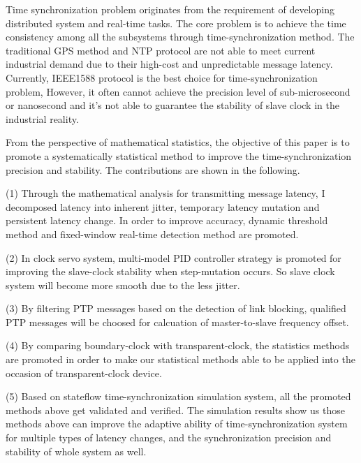 \begin{englishabstract}

Time synchronization problem originates from the requirement of developing distributed system and real-time tasks. The core problem is to achieve the time consistency among all the subsystems through time-synchronization method. The traditional GPS method and NTP protocol are not able to meet current industrial demand due to their high-cost and unpredictable message latency. Currently, IEEE1588 protocol is the best choice for time-synchronization problem, However, it often cannot achieve the precision level of sub-microsecond or nanosecond and it's not able to guarantee the stability of slave clock in the industrial reality.

From the perspective of mathematical statistics, the objective of this paper is to promote a systematically statistical method to improve the time-synchronization precision and stability. The contributions are shown in the following.

(1) Through the mathematical analysis for transmitting message latency, I decomposed latency into inherent jitter, temporary latency mutation and persistent latency change. In order to improve accuracy, dynamic threshold method and fixed-window real-time detection method are promoted.

(2) In clock servo system, multi-model PID controller strategy is promoted for improving the slave-clock stability when step-mutation occurs. So slave clock system will become more smooth due to the less jitter.

(3) By filtering PTP messages based on the detection of link blocking, qualified PTP messages will be choosed for calcuation of master-to-slave frequency offset.

(4) By comparing boundary-clock with transparent-clock, the statistics methods are promoted in order to make our statistical methods able to be applied into the occasion of transparent-clock device.

(5) Based on stateflow time-synchronization simulation system, all the promoted methods above get validated and verified. The simulation results show us those methods above can improve the adaptive ability of time-synchronization system for multiple types of latency changes, and the synchronization precision and stability of whole system as well.

\end{englishabstract}


